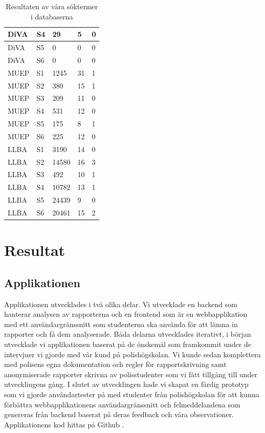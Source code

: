 \documentclass[swedish]{maucsthesis}
\begin{document}
\begin{table}[H]
\begin{tabular}{|l|l|l|l|l|}
DiVA    & S4      & 29       & 5              & 0                \\ \hline
DiVA    & S5      & 0        & 0              & 0                \\ \hline
DiVA    & S6      & 0        & 0              & 0                \\ \hline
MUEP    & S1      & 1245     & 31             & 1                \\ \hline
MUEP    & S2      & 380      & 15             & 1                \\ \hline
MUEP    & S3      & 209      & 11             & 0                \\ \hline
MUEP    & S4      & 531      & 12             & 0                \\ \hline
MUEP    & S5      & 175      & 8              & 1                \\ \hline
MUEP    & S6      & 225      & 12              & 0                \\ 
\hline
LLBA    & S1      & 3190     & 14             & 0                \\ \hline
LLBA    & S2      & 14580    & 16             & 3                \\ \hline
LLBA    & S3      & 492      & 10             & 1                \\ \hline
LLBA    & S4      & 10782    & 13             & 1                \\ \hline
LLBA    & S5      & 24439    & 9              & 0                \\ \hline
LLBA    & S6      & 20461    & 15              & 2                \\ \hline
\end{tabular}
\caption*{Resultaten av våra söktermer i databaserna}
\label{searchtable}
\end{table}
\section{Resultat}
\subsection{Applikationen}\label{applikationen}

Applikationen utvecklades i två olika delar. Vi utvecklade en backend som
hanterar analysen av rapporterna och en frontend som är en webbapplikation med
ett användargränssnitt som studenterna ska använda för att lämna in rapporter
och få dem analyserade. Båda delarna utvecklades iterativt, i början utvecklade
vi applikationen baserat på de önskemål som framkommit under de intervjuer vi
gjorde med vår kund på polishögskolan. Vi kunde sedan komplettera med polisens
egna dokumentation och regler för rapportskrivning samt anonymiserade rapporter
skrivna av polisstudenter som vi fått tillgång till under utvecklingens gång. I
slutet av utvecklingen hade vi skapat en färdig prototyp som vi gjorde
användartester på med studenter från polishögskolan för att kunna förbättra
webbapplikationens användargränssnitt och felmeddelandena som genereras från
backend baserat på deras feedback och våra observationer.
Applikationens kod hittas på Github \cite{kalle:2019}. 
\end{document}

